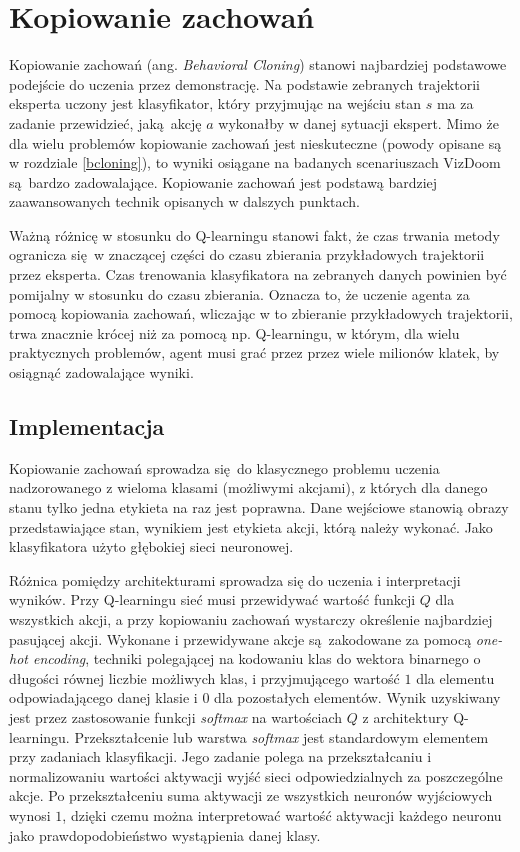 \documentclass[polish,master,a4paper,oneside]{ppfcmthesis}
\begin{document}
 \section{Kopiowanie zachowań} \label{behavioral_cloning}

Kopiowanie zachowań (ang. \textit{Behavioral Cloning}) stanowi najbardziej podstawowe podejście do uczenia przez demonstrację. Na podstawie zebranych trajektorii eksperta uczony jest klasyfikator, który przyjmując na wejściu stan $s$ ma za zadanie przewidzieć, jaką akcję $a$ wykonałby w danej sytuacji ekspert. Mimo że dla wielu problemów kopiowanie zachowań jest nieskuteczne (powody opisane są w rozdziale \ref{bcloning}), to wyniki osiągane na badanych scenariuszach VizDoom są bardzo zadowalające. Kopiowanie zachowań jest podstawą bardziej zaawansowanych technik opisanych w dalszych punktach.

Ważną różnicę w stosunku do Q-learningu stanowi fakt, że czas trwania metody ogranicza się w znaczącej części do czasu zbierania przykładowych trajektorii przez eksperta. Czas trenowania klasyfikatora na zebranych danych powinien być pomijalny w stosunku do czasu zbierania. Oznacza to, że uczenie agenta za pomocą kopiowania zachowań, wliczając w to zbieranie przykładowych trajektorii, trwa znacznie krócej niż za pomocą np. Q-learningu, w którym, dla wielu praktycznych problemów, agent musi grać przez przez wiele milionów klatek, by osiągnąć zadowalające wyniki. 

\subsection{Implementacja}

Kopiowanie zachowań sprowadza się do klasycznego problemu uczenia nadzorowanego z wieloma klasami (możliwymi akcjami), z których dla danego stanu tylko jedna etykieta na raz jest poprawna. Dane wejściowe stanowią obrazy przedstawiające stan, wynikiem jest etykieta akcji, którą należy wykonać. Jako klasyfikatora użyto głębokiej sieci neuronowej.

Różnica pomiędzy architekturami sprowadza się do uczenia i interpretacji wyników. Przy Q-learningu sieć musi przewidywać wartość funkcji $Q$ dla wszystkich akcji, a przy kopiowaniu zachowań wystarczy określenie najbardziej pasującej akcji. Wykonane i przewidywane akcje są zakodowane za pomocą \textit{one-hot encoding}, techniki polegającej na kodowaniu klas do wektora binarnego o długości równej liczbie możliwych klas, i przyjmującego wartość $1$ dla elementu odpowiadającego danej klasie i $0$ dla pozostałych elementów. Wynik uzyskiwany jest przez zastosowanie funkcji \textit{softmax} na wartościach $Q$ z architektury Q-learningu. Przekształcenie lub warstwa \textit{softmax} jest standardowym elementem przy zadaniach klasyfikacji. Jego zadanie polega na przekształcaniu i normalizowaniu wartości aktywacji wyjść sieci odpowiedzialnych za poszczególne akcje. Po przekształceniu suma aktywacji ze wszystkich neuronów wyjściowych wynosi $1$, dzięki czemu można interpretować wartość aktywacji każdego neuronu jako prawdopodobieństwo wystąpienia danej klasy.
\end{document}
